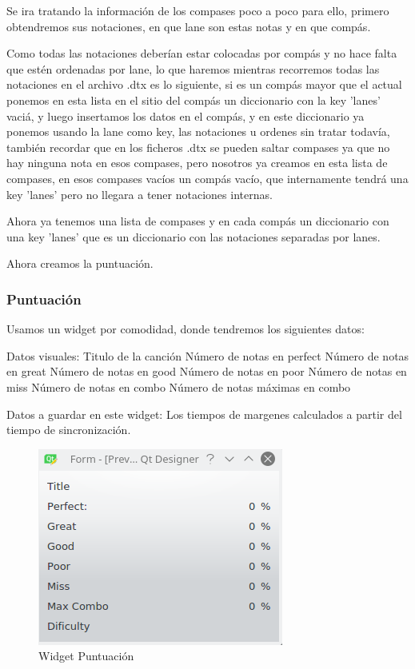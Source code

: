 \documentclass[a4paper,11pt,oneside]{book}
\begin{document}
Se ira tratando la información de los compases poco a poco para ello, primero obtendremos sus notaciones, en que lane son estas notas y en que compás.

Como todas las notaciones deberían estar colocadas por compás y no hace falta que estén ordenadas por lane, lo que haremos mientras recorremos todas las notaciones en el archivo .dtx es lo siguiente, si es un compás mayor que el actual ponemos en esta lista en el sitio del compás un diccionario con la key 'lanes' vaciá, y luego insertamos los datos en el compás, y en este diccionario ya ponemos usando la lane como key, las notaciones u ordenes sin tratar todavía, también recordar que en los ficheros .dtx se pueden saltar compases ya que no hay ninguna nota en esos compases, pero nosotros ya creamos en esta lista de compases, en esos compases vacíos un compás vacío, que internamente tendrá una key 'lanes' pero no llegara a tener notaciones internas.

Ahora ya tenemos una lista de compases y en cada compás un diccionario con una key 'lanes' que es un diccionario con las notaciones separadas por lanes.


Ahora creamos la puntuación.
\subsubsection{Puntuación}
Usamos un widget por comodidad, donde tendremos los siguientes datos:

Datos visuales:
Titulo de la canción
Número de notas en perfect
Número de notas en great
Número de notas en good
Número de notas en poor
Número de notas en miss
Número de notas en combo
Número de notas máximas en combo

Datos a guardar en este widget:
Los tiempos de margenes calculados a partir del tiempo de sincronización.

\begin{figure}[H]
\begin{center}
\includegraphics[scale=0.8]{Imagenes/WidgetPuntuacion.png}
\caption{Widget Puntuación}
\label{Widget Puntuación}
\end{center}
\end{figure}
\end{document}
